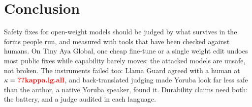 \section{Conclusion}
Safety fixes for open-weight models should be judged by what survives in the forms people run, and measured with
tools that have been checked against humans. On Tiny Aya Global, one cheap fine-tune or a single weight edit undoes
most public fixes while capability barely moves: the attacked models are unsafe, not broken. The instruments failed
too: Llama Guard agreed with a human at $\kappa=\V{kappa.lg.all}$, and back-translated judging made Yoruba look far
less safe than the author, a native Yoruba speaker, found it. Durability claims need both: the battery, and a judge audited in each
language.
